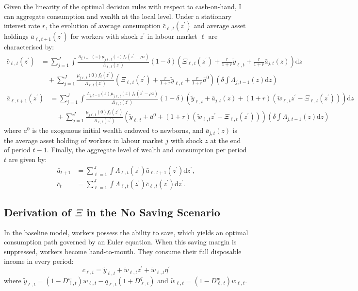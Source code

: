 \documentclass[12pt, a4paper]{article}
\begin{document}
Given the linearity of the optimal decision rules with respect to cash-on-hand, I can aggregate consumption and wealth at the local level. Under a stationary interest rate $r$, the evolution of average consumption $\bar{c}_{\ell,t}(z^\prime)$ and average asset holdings $\bar{a}_{\ell,t+1}(z^\prime)$ for workers with shock $z^\prime$ in labour market $\ell$ are characterised by:
\begin{align}
\bar{c}_{\ell,t}(z^\prime) &= \sum_{j=1}^J \int \frac{\Lambda_{j,t-1}(z)\mu_{j\ell,t}(z)f_\ell(z^\prime - \rho z)}{\Lambda_{\ell,t}(z^\prime)} (1-\delta) \left( \Xi_{\ell,t}(z^\prime) + \frac{r}{1+r} \tilde{y}_{\ell,t} + \frac{r}{1+r} \bar{a}_{j,t}(z) \right) \mathrm{d}z \nonumber \\
&\quad + \sum_{j=1}^J \frac{\mu_{j\ell,t}(0) f_\ell(z^\prime)}{\Lambda_{\ell,t}(z^\prime)} \left( \Xi_{\ell,t}(z^\prime) + \frac{r}{1+r} \tilde{y}_{\ell,t} + \frac{r}{1+r} \bar{a}^0 \right) \left( \delta \int \Lambda_{j,t-1}(z) \mathrm{d}z \right) 
\end{align}
\begin{align}
\bar{a}_{\ell,t+1}(z^\prime) &= \sum_{j=1}^J \int \frac{\Lambda_{j,t-1}(z)\mu_{j\ell,t}(z)f_\ell(z^\prime - \rho z)}{\Lambda_{\ell,t}(z^\prime)} (1-\delta) \left( \tilde{y}_{\ell,t} + \bar{a}_{j,t}(z) + (1+r)(\tilde{w}_{\ell,t}z^\prime - \Xi_{\ell,t}(z^\prime)) \right) \mathrm{d}z \nonumber \\
&\quad + \sum_{j=1}^J \frac{\mu_{j\ell,t}(0) f_\ell(z^\prime)}{\Lambda_{\ell,t}(z^\prime)} \left( \tilde{y}_{\ell,t} + \bar{a}^0 + (1+r)(\tilde{w}_{\ell,t}z^\prime - \Xi_{\ell,t}(z^\prime)) \right) \left( \delta \int \Lambda_{j,t-1}(z) \mathrm{d}z \right)
\end{align}
where $a^0$ is the exogenous initial wealth endowed to newborns, and $\bar{a}_{j,t}(z)$ is the average asset holding of workers in labour market $j$ with shock $z$ at the end of period $t-1$. Finally, the aggregate level of wealth and consumption per period $t$ are given by:
\begin{align}
  \bar{a}_{t+1} &= \sum_{\ell=1}^J \int \Lambda_{\ell,t}(z^\prime) \bar{a}_{\ell,t+1}(z^\prime) \mathrm{d}z^\prime, \\
  \bar{c}_{t} &= \sum_{\ell=1}^J \int \Lambda_{\ell,t}(z^\prime) \bar{c}_{\ell,t}(z^\prime) \mathrm{d}z^\prime.
\end{align}

\subsection{Derivation of $\Xi$ in the No Saving Scenario}
\label{sec:appendix_no_saving}
In the baseline model, workers possess the ability to save, which yields an optimal consumption path governed by an Euler equation. When this saving margin is suppressed, workers become hand-to-mouth. They consume their full disposable income in every period:
\begin{equation}
c_{\ell,t} = \tilde{y}_{\ell,t} + \tilde{w}_{\ell,t}z^\prime + \tilde{w}_{\ell,t}\eta^\prime
\end{equation}
where $\tilde{y}_{\ell,t} = (1 - D^w_{\ell,t})w_{\ell,t} - q_{\ell,t}(1+ D^q_{\ell,t})$ and $\tilde{w}_{\ell,t} = (1 - D^w_{\ell,t})w_{\ell,t}$.
\end{document}
